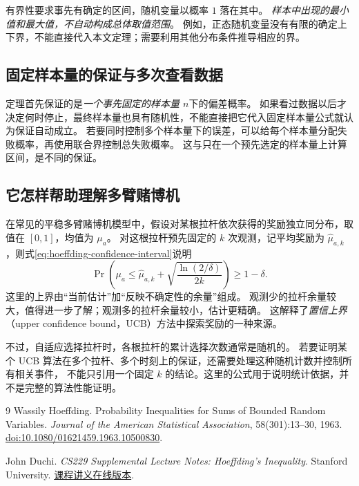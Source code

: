 \documentclass[UTF8,12pt,a4paper,fontset=fandol]{ctexart}
\begin{document}
有界性要求事先有确定的区间，随机变量以概率 $1$ 落在其中。
\emph{样本中出现的最小值和最大值，不自动构成总体取值范围}。
例如，正态随机变量没有有限的确定上下界，不能直接代入本文定理；需要利用其他分布条件推导相应的界。

\subsection{固定样本量的保证与多次查看数据}

定理首先保证的是\emph{一个事先固定的样本量 $n$}下的偏差概率。
如果看过数据以后才决定何时停止，最终样本量也具有随机性，不能直接把它代入固定样本量公式就认为保证自动成立。
若要同时控制多个样本量下的误差，可以给每个样本量分配失败概率，再使用联合界控制总失败概率。
这与只在一个预先选定的样本量上计算区间，是不同的保证。

\subsection{它怎样帮助理解多臂赌博机}

在常见的平稳多臂赌博机模型中，假设对某根拉杆依次获得的奖励独立同分布，取值在 $[0,1]$，均值为 $\mu_a$。
对这根拉杆预先固定的 $k$ 次观测，记平均奖励为 $\widehat\mu_{a,k}$，则式\eqref{eq:hoeffding-confidence-interval}说明
\[
  \Pr\!\left(\mu_a\leq
    \widehat\mu_{a,k}+\sqrt{\frac{\ln(2/\delta)}{2k}}\right)\geq1-\delta.
\]
这里的上界由“当前估计”加“反映不确定性的余量”组成。
观测少的拉杆余量较大，值得进一步了解；观测多的拉杆余量较小，估计更精确。
这解释了\emph{置信上界}（upper confidence bound，UCB）方法中探索奖励的一种来源。

不过，自适应选择拉杆时，各根拉杆的累计选择次数通常是随机的。
若要证明某个 UCB 算法在多个拉杆、多个时刻上的保证，还需要处理这种随机计数并控制所有相关事件，
不能只引用一个固定 $k$ 的结论。这里的公式用于说明统计依据，并不是完整的算法性能证明。

\begin{thebibliography}{9}
Wassily Hoeffding.
\newblock Probability Inequalities for Sums of Bounded Random Variables.
\newblock \textit{Journal of the American Statistical Association}, 58(301):13--30, 1963.
\newblock \href{https://doi.org/10.1080/01621459.1963.10500830}{doi:10.1080/01621459.1963.10500830}.

John Duchi.
\newblock \textit{CS229 Supplemental Lecture Notes: Hoeffding's Inequality}.
\newblock Stanford University.
\newblock \href{https://cs229.stanford.edu/notes_archive/cs229-notes-all/hoeffding.pdf}{课程讲义在线版本}.
\end{thebibliography}
\end{document}
